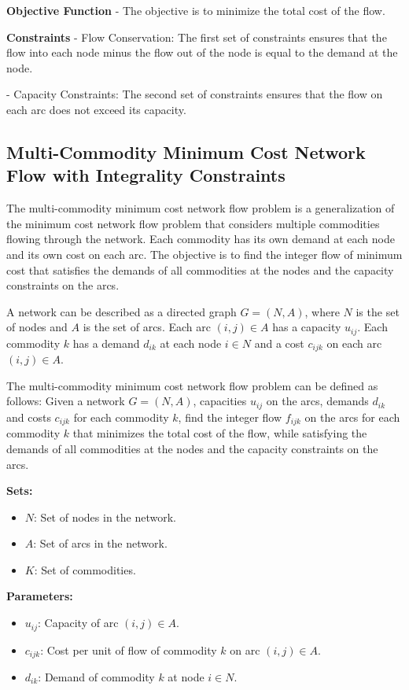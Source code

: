 {\noindent \textbf{Objective Function}
- The objective is to minimize the total cost of the flow.

\noindent \textbf{Constraints}
- Flow Conservation: The first set of constraints ensures that the flow into each node minus the flow out of the node is equal to the demand at the node.

- Capacity Constraints: The second set of constraints ensures that the flow on each arc does not exceed its capacity.


\subsection{Multi-Commodity Minimum Cost Network Flow with Integrality Constraints}

The multi-commodity minimum cost network flow problem is a generalization of the minimum cost network flow problem that considers multiple commodities flowing through the network. Each commodity has its own demand at each node and its own cost on each arc. The objective is to find the integer flow of minimum cost that satisfies the demands of all commodities at the nodes and the capacity constraints on the arcs.

A network can be described as a directed graph \( G = (N, A) \), where \( N \) is the set of nodes and \( A \) is the set of arcs. Each arc \( (i, j) \in A \) has a capacity \( u_{ij} \). Each commodity \( k \) has a demand \( d_{ik} \) at each node \( i \in N \) and a cost \( c_{ijk} \) on each arc \( (i, j) \in A \).

The multi-commodity minimum cost network flow problem can be defined as follows: Given a network \( G = (N, A) \), capacities \( u_{ij} \) on the arcs, demands \( d_{ik} \) and costs \( c_{ijk} \) for each commodity \( k \), find the integer flow \( f_{ijk} \) on the arcs for each commodity \( k \) that minimizes the total cost of the flow, while satisfying the demands of all commodities at the nodes and the capacity constraints on the arcs.

\noindent \textbf{Sets:}
\begin{itemize}
\item \( N \): Set of nodes in the network.
\item \( A \): Set of arcs in the network.
\item \( K \): Set of commodities.
\end{itemize}

\noindent \textbf{Parameters:}
\begin{itemize}
\item \( u_{ij} \): Capacity of arc \( (i, j) \in A \).
\item \( c_{ijk} \): Cost per unit of flow of commodity \( k \) on arc \( (i, j) \in A \).
\item \( d_{ik} \): Demand of commodity \( k \) at node \( i \in N \).
\end{itemize}

}
